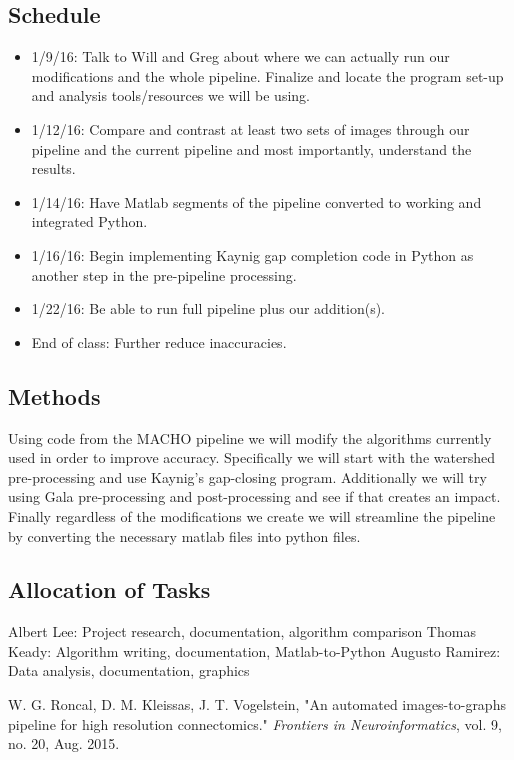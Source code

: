 \documentclass[11pt]{article}
\begin{document}
\subsection{Schedule}
\begin{itemize}
\item 1/9/16: Talk to Will and Greg about where we can actually run our modifications and the whole pipeline. Finalize and locate the program set-up and analysis tools/resources we will be using. \newline
\item 1/12/16: Compare and contrast at least two sets of images through our pipeline and the current pipeline and most importantly, understand the results. \newline
\item 1/14/16: Have Matlab segments of the pipeline converted to working and integrated Python. \newline
\item 1/16/16: Begin implementing Kaynig gap completion code in Python as another step in the pre-pipeline processing. \newline
\item 1/22/16: Be able to run full pipeline plus our addition(s). \newline
\item End of class: Further reduce inaccuracies. \newline
\end{itemize}

\subsection{Methods}

Using code from the MACHO pipeline we will modify the algorithms currently used in order to improve accuracy. Specifically we will start with the watershed pre-processing and use Kaynig's gap-closing program. Additionally we will try using Gala pre-processing and post-processing and see if that creates an impact. Finally regardless of the modifications we create we will streamline the pipeline by converting the necessary matlab files into python files.

\subsection{Allocation of Tasks}
Albert Lee: Project research, documentation, algorithm comparison \newline
Thomas Keady: Algorithm writing, documentation, Matlab-to-Python \newline
Augusto Ramirez: Data analysis, documentation, graphics\newline

\newpage

\begin{thebibliography}{1}
 W. G. Roncal, D. M. Kleissas, J. T. Vogelstein, "An automated images-to-graphs pipeline for high resolution connectomics." \textit{Frontiers in Neuroinformatics}, vol. 9, no. 20, Aug. 2015.
\end{thebibliography}
\end{document}
